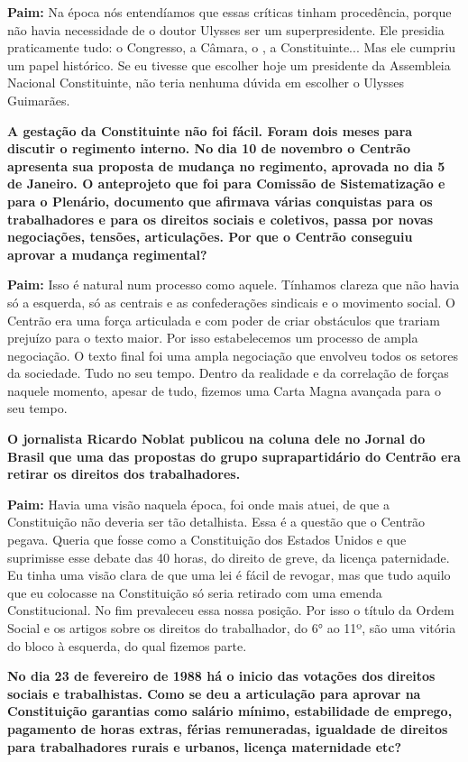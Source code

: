 \textbf{Paim:} Na época nós entendíamos que essas críticas tinham
procedência, porque não havia necessidade de o doutor Ulysses ser um
superpresidente. Ele presidia praticamente tudo: o Congresso, a Câmara,
o , a Constituinte... Mas ele cumpriu um papel histórico. Se eu
tivesse que escolher hoje um presidente da Assembleia Nacional
Constituinte, não teria nenhuma dúvida em escolher o Ulysses Guimarães.

\textbf{A gestação da Constituinte não foi fácil. Foram dois meses para
discutir o regimento interno. No dia 10 de novembro o Centrão apresenta
sua proposta de mudança no regimento, aprovada no dia 5 de Janeiro. O
anteprojeto que foi para Comissão de Sistematização e para o Plenário,
documento que afirmava várias conquistas para os trabalhadores e para os
direitos sociais e coletivos, passa por novas negociações, tensões,
articulações. Por que o Centrão conseguiu aprovar a mudança regimental?}

\textbf{Paim:} Isso é natural num processo como aquele. Tínhamos clareza
que não havia só a esquerda, só as centrais e as confederações sindicais
e o movimento social. O Centrão era uma força articulada e com poder de
criar obstáculos que trariam prejuízo para o texto maior. Por isso
estabelecemos um processo de ampla negociação. O texto final foi uma
ampla negociação que envolveu todos os setores da sociedade. Tudo no seu
tempo. Dentro da realidade e da correlação de forças naquele momento,
apesar de tudo, fizemos uma Carta Magna avançada para o seu tempo.

\textbf{O jornalista Ricardo Noblat publicou na coluna dele no Jornal do
Brasil que uma das propostas do grupo suprapartidário do Centrão era
retirar os direitos dos trabalhadores.}

\textbf{Paim:} Havia uma visão naquela época, foi onde mais atuei, de
que a Constituição não deveria ser tão detalhista. Essa é a questão que
o Centrão pegava. Queria que fosse como a Constituição dos Estados
Unidos e que suprimisse esse debate das 40 horas, do direito de greve,
da licença paternidade. Eu tinha uma visão clara de que uma lei é fácil
de revogar, mas que tudo aquilo que eu colocasse na Constituição só
seria retirado com uma emenda Constitucional. No fim prevaleceu essa
nossa posição. Por isso o título da Ordem Social e os artigos sobre os
direitos do trabalhador, do 6° ao 11º, são uma vitória do bloco à
esquerda, do qual fizemos parte.

\textbf{No dia 23 de fevereiro de 1988 há o inicio das votações dos
direitos sociais e trabalhistas. Como se deu a articulação para aprovar
na Constituição garantias como salário mínimo, estabilidade de emprego,
pagamento de horas extras, férias remuneradas, igualdade de direitos
para trabalhadores rurais e urbanos, licença maternidade etc?}

